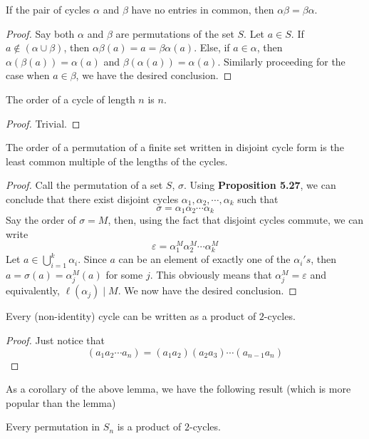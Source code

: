 \begin{proposition}
	If the pair of cycles $\alpha$ and $\beta$ have no entries in common, then $\alpha\beta=\beta\alpha$.
\end{proposition}
\begin{proof}
	Say both $\alpha$ and $\beta$ are permutations of the set $S$. Let $a\in S$. If $a\notin(\alpha\cup\beta)$, then $\alpha\beta(a)=a=\beta\alpha(a)$. Else, if $a\in\alpha$, then $\alpha(\beta(a)) = \alpha(a)$ and $\beta(\alpha(a))=\alpha(a)$. Similarly proceeding for the case when $a\in\beta$, we have the desired conclusion.
\end{proof}

\begin{lemma}
	The order of a cycle of length $n$ is $n$.
\end{lemma}
\begin{proof}
	Trivial.
\end{proof}

\begin{theorem}[Ruffini 1799]
	The order of a permutation of a finite set written in disjoint cycle form is the least common multiple of the lengths of the cycles.
\end{theorem}
\begin{proof}
	Call the permutation of a set $S$, $\sigma$. Using \textbf{Proposition 5.27}, we can conclude that there exist disjoint cycles $\alpha_1,\alpha_2,\cdots,\alpha_k$ such that 
	$$
	\sigma = \alpha_1\alpha_2\cdots\alpha_k
	$$
	Say the order of $\sigma=M$, then, using the fact that disjoint cycles commute, we can write 
	$$
	\varepsilon = \alpha_1^M\alpha_2^M\cdots\alpha_k^M
	$$
	Let $a\in \bigcup_{i=1}^{k}\alpha_i$. Since $a$ can be an element of exactly one of the $\alpha_i's$, then $a=\sigma(a)=\alpha_j^M(a)$ for some $j$. This obviously means that $\alpha_j^M=\varepsilon$ and equivalently, $\ell(\alpha_j)\mid M$. We now have the desired conclusion.
\end{proof}

\begin{lemma}
	Every (non-identity) cycle can be written as a product of $2$-cycles.
\end{lemma}
\begin{proof}
	Just notice that 
	$$
	(a_1a_2\cdots a_n)=(a_1a_2)(a_2a_3)\cdots(a_{n-1}a_{n})
	$$
\end{proof}

As a corollary of the above lemma, we have the following result (which is more popular than the lemma)
\begin{proposition}
	Every permutation in $S_n$ is a product of $2$-cycles.
\end{proposition}

